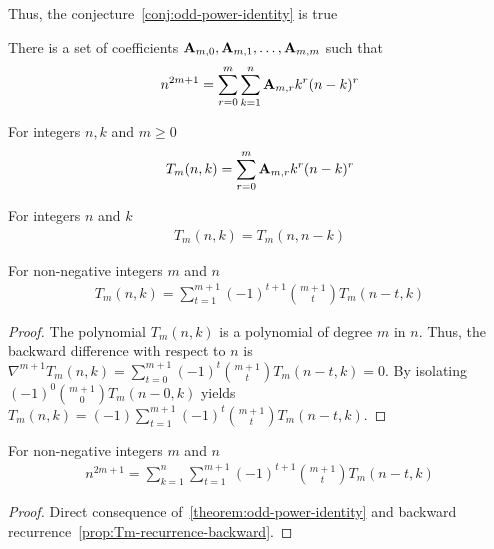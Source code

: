 Thus, the conjecture~\eqref{conj:odd-power-identity} is true

\begin{theorem}
    \label{theorem:odd-power-identity}
    There is a set of coefficients ${\mathbf{A}} \sb{m,0}, {\mathbf{A}} \sb{m,1}, \ldots, {\mathbf{A}} \sb{m,m}$ such that
    \begin{align*}
        n^{2m+1} = \sum_{r=0}^{m} \sum_{k=1}^{n} {\mathbf{A}} \sb{m,r} k^r (n-k)^r
    \end{align*}
\end{theorem}

\begin{definition}
    For integers $n,k$ and $m \geq 0$
    \label{def:bivariate-sum-Tm}
    \begin{align*}
        T_{m}(n,k) = \sum_{r=0}^{m} {\mathbf{A}} \sb{m,r} k^r (n-k)^r
    \end{align*}
\end{definition}

\begin{proposition}[Symmetry of $T_m$]
    \label{prop:Tm-symmetry}
    For integers $n$ and $k$
    \begin{align*}
        T_{m} (n, k) = T_{m} (n, n-k)
    \end{align*}
\end{proposition}

\begin{proposition}
    \label{prop:Tm-recurrence-backward}
    For non-negative integers $m$ and $n$
    \begin{align*}
        T_{m} (n, k) = \sum_{t=1}^{m+1} (-1)^{t+1} \binom{m+1}{t} T_{m} (n-t, k)
    \end{align*}
    \begin{proof}
        The polynomial $T_{m} (n,k)$ is a polynomial of degree $m$ in $n$.
        Thus, the backward difference with respect to $n$ is
        $\nabla^{m+1} T_{m} (n, k) = \sum_{t=0}^{m+1} (-1)^{t} \binom{m+1}{t} T_{m} (n-t, k) = 0$.
        By isolating $(-1)^{0} \binom{m+1}{0} T_{m} (n-0, k)$ yields
        $T_{m} (n, k) = (-1) \sum_{t=1}^{m+1} (-1)^{t} \binom{m+1}{t} T_{m} (n-t, k)$.
    \end{proof}
\end{proposition}

\begin{proposition}
    \label{prop:odd-power-decomposition-backward}
    For non-negative integers $m$ and $n$
    \begin{align*}
        n^{2m+1} = \sum_{k=1}^{n} \sum_{t=1}^{m+1} (-1)^{t+1} \binom{m+1}{t} T_{m} (n-t, k)
    \end{align*}
    \begin{proof}
        Direct consequence of~\eqref{theorem:odd-power-identity}
        and backward recurrence~\eqref{prop:Tm-recurrence-backward}.
    \end{proof}
\end{proposition}

